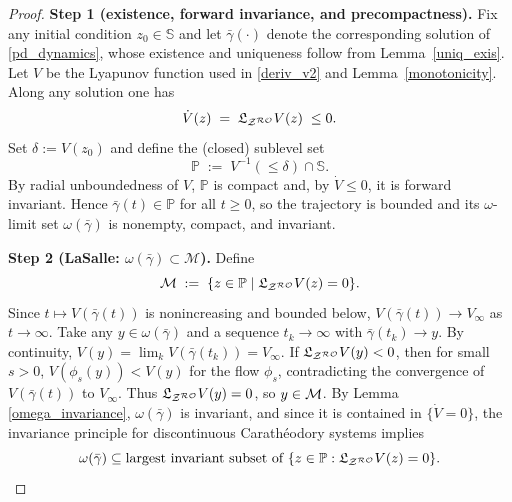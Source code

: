 \documentclass[journal,twoside,web]{ieeecolor}
\newcommand{\rev}[1]{\textcolor{revisionblue}{#1}}
\begin{document}
\begin{proof}
\rev{\textbf{Step 1 (existence, forward invariance, and precompactness).}
Fix any initial condition $z_0\in\mathbb S$ and let $\bar\gamma(\cdot)$ denote the corresponding solution of \eqref{pd_dynamics}, whose existence and uniqueness follow from Lemma~\ref{uniq_exis}.
Let $V$ be the Lyapunov function used in \eqref{deriv_v2} and Lemma~\ref{monotonicity}. Along any solution one has
\[
\dot V(z)\;=\;\mathfrak{L}_{{\cal Z}^{\cal RO}}V(z)\;\le 0.
\]
Set $\delta:=V(z_0)$ and define the (closed) sublevel set
\[
\mathbb P\;:=\;V^{-1}(\le \delta)\cap \mathbb S.
\]
By radial unboundedness of $V$, $\mathbb P$ is compact and, by $\dot V\le 0$, it is forward invariant. Hence $\bar\gamma(t)\in\mathbb P$ for all $t\ge 0$, so the trajectory is bounded and its $\omega$-limit set $\omega(\bar\gamma)$ is nonempty, compact, and invariant.}

\medskip
\rev{\textbf{Step 2 (LaSalle: $\omega(\bar\gamma)\subset \mathcal M$).}
Define
\[
{\cal M}\;:=\;\{z\in \mathbb P\mid \mathfrak{L}_{{\cal Z}^{\cal RO}}V(z)=0\}.
\]
Since $t\mapsto V(\bar\gamma(t))$ is nonincreasing and bounded below, $V(\bar\gamma(t))\to V_\infty$ as $t\to\infty$.
Take any $y\in \omega(\bar\gamma)$ and a sequence $t_k\to\infty$ with $\bar\gamma(t_k)\to y$. By continuity, $V(y)=\lim_k V(\bar\gamma(t_k))=V_\infty$.
If $\mathfrak{L}_{{\cal Z}^{\cal RO}}V(y)<0$, then for small $s>0$, $V(\phi_s(y))<V(y)$ for the flow $\phi_s$, contradicting the convergence of $V(\bar\gamma(t))$ to $V_\infty$.
Thus $\mathfrak{L}_{{\cal Z}^{\cal RO}}V(y)=0$, so $y\in{\cal M}$. By Lemma \ref{omega_invariance}, $\omega(\bar\gamma)$ is invariant, and since it is contained in $\{\dot V=0\}$, the invariance principle for discontinuous Carathéodory systems \cite[Prop.~2.1]{cherukuri2016} implies
\[
\omega(\bar\gamma)\subseteq \text{largest invariant subset of }\{z\in\mathbb P:\mathfrak{L}_{{\cal Z}^{\cal RO}}V(z)=0\}.
\]}


\end{proof}
\end{document}
